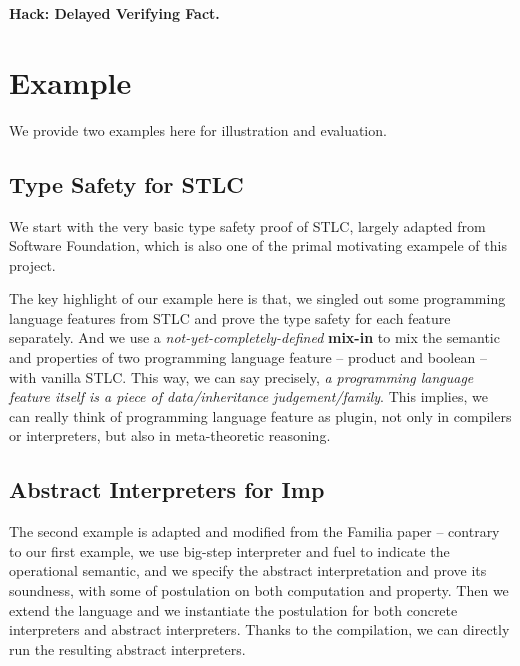 \textbf{Hack: Delayed Verifying Fact.}


\section{Example}
We provide two examples here for illustration and evaluation. 

\subsection{Type Safety for STLC}
We start with the very basic type safety proof of STLC, largely adapted from Software Foundation, which is also one of the primal motivating exampele of this project. 

The key highlight of our example here is that, we singled out some programming language features from STLC and prove the type safety for each feature separately. And we use a  \textit{not-yet-completely-defined} \textbf{mix-in} to mix the semantic and properties of two programming language feature -- product and boolean -- with vanilla STLC. This way, we can say precisely, \textit{a programming language feature itself is a piece of data/inheritance judgement/family}. This implies, we can really think of programming language feature as plugin, not only in compilers or interpreters, but also in meta-theoretic reasoning.

\subsection{Abstract Interpreters for Imp}
The second example is adapted and modified from the Familia paper -- contrary to our first example, we use big-step interpreter and fuel to indicate the operational semantic, and we specify the abstract interpretation and prove its soundness, with some of postulation on both computation and property. Then we extend the language and we instantiate the postulation for both concrete interpreters and abstract interpreters. Thanks to the compilation, we can directly run the resulting abstract interpreters.